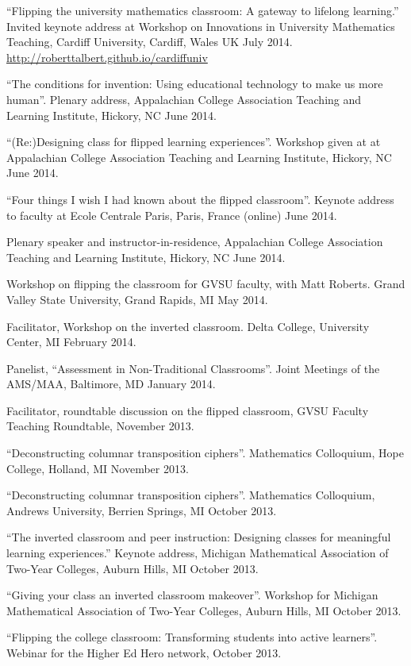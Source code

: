 \documentclass[letterpaper]{article}
\renewenvironment{itemize}{
  \begin{list}{}{
    \setlength{\leftmargin}{1.5em}
	\setlength{\itemsep}{0in}
  }
}{
  \end{list}
}
\begin{document}
\begin{itemize}
	\item ``Flipping the university mathematics classroom: A gateway to lifelong learning.'' Invited keynote address at Workshop on Innovations in University Mathematics Teaching, Cardiff University, Cardiff, Wales UK July 2014. \url{http://roberttalbert.github.io/cardiffuniv}
	\item ``The conditions for invention: Using educational technology to make us more human''. Plenary address, Appalachian College Association Teaching and Learning Institute, Hickory, NC June 2014.
	\item ``(Re:)Designing class for flipped learning experiences''.  Workshop given at at Appalachian College Association Teaching and Learning Institute, Hickory, NC June 2014.
	\item ``Four things I wish I had known about the flipped classroom''. Keynote address to faculty at Ecole Centrale Paris, Paris, France (online) June 2014.
	\item Plenary speaker and instructor-in-residence, Appalachian College Association Teaching and Learning Institute, Hickory, NC June 2014.
	\item Workshop on flipping the classroom for GVSU faculty, with Matt Roberts. Grand Valley State University, Grand Rapids, MI May 2014.
	\item Facilitator, Workshop on the inverted classroom. Delta College, University Center, MI February 2014.
	\item Panelist, ``Assessment in Non-Traditional Classrooms''. Joint Meetings of the AMS/MAA, Baltimore, MD January 2014.
	\item Facilitator, roundtable discussion on the flipped classroom, GVSU Faculty Teaching Roundtable, November 2013.
	\item ``Deconstructing columnar transposition ciphers''. Mathematics Colloquium, Hope College, Holland, MI November 2013.
	\item ``Deconstructing columnar transposition ciphers''. Mathematics Colloquium, Andrews University, Berrien Springs, MI October 2013.
	\item ``The inverted classroom and peer instruction: Designing classes for meaningful learning experiences.'' Keynote address, Michigan Mathematical Association of Two-Year Colleges, Auburn Hills, MI October 2013.
	\item ``Giving your class an inverted classroom makeover''. Workshop for Michigan Mathematical Association of Two-Year Colleges, Auburn Hills, MI October 2013.
	\item ``Flipping the college classroom: Transforming students into active learners''. Webinar for the Higher Ed Hero network, October 2013.

\end{itemize}
\end{document}
